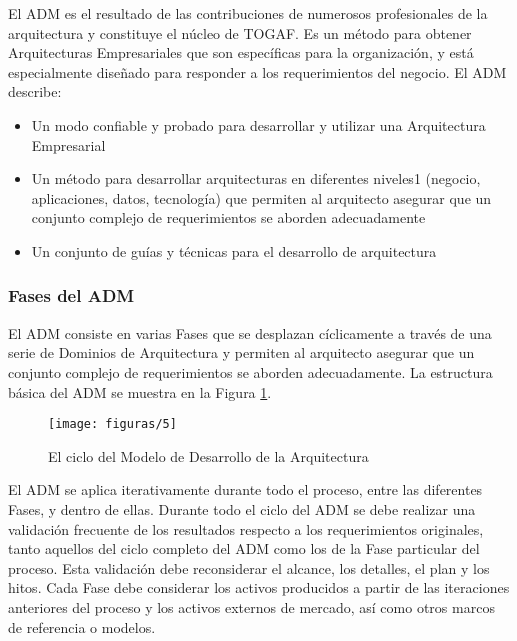   El ADM es el resultado de las contribuciones de numerosos profesionales de la arquitectura y constituye el núcleo de TOGAF. Es un método para obtener Arquitecturas Empresariales que son específicas para la organización, y está especialmente diseñado para responder a los requerimientos del negocio. El ADM describe:
  
  \begin{itemize}
  	\item Un modo confiable y probado para desarrollar y utilizar una Arquitectura Empresarial
  	\item Un método para desarrollar arquitecturas en diferentes niveles1 (negocio, aplicaciones, datos, tecnología) que permiten al arquitecto asegurar que un conjunto complejo de requerimientos se aborden adecuadamente
  	\item Un conjunto de guías y técnicas para el desarrollo de arquitectura
 \end{itemize}
  
  \subsubsection{Fases del ADM}
  El ADM consiste en varias Fases que se desplazan cíclicamente a través de una serie de Dominios de Arquitectura y permiten al arquitecto asegurar que un conjunto complejo de requerimientos se aborden adecuadamente. La estructura básica del ADM se muestra en la Figura \ref{figura5}.
  
    \begin{figure}[H]
    	\centering
    	\texttt{[image: figuras/5]}
    	\captionsetup{width=.95\textwidth}
    	\caption{El ciclo del Modelo de Desarrollo de la Arquitectura \cite{ref4}}
    	\label{figura5}
    \end{figure}
    
    El ADM se aplica iterativamente durante todo el proceso, entre las diferentes Fases, y dentro de ellas. Durante todo el ciclo del ADM se debe realizar una validación frecuente de los resultados respecto a los requerimientos originales, tanto aquellos del ciclo completo del ADM como los de la Fase particular del proceso. Esta validación debe reconsiderar el alcance, los detalles, el plan y los hitos. Cada Fase debe considerar los activos producidos a partir de las iteraciones anteriores del proceso y los activos externos de mercado, así como otros marcos de referencia o modelos. \\
    

